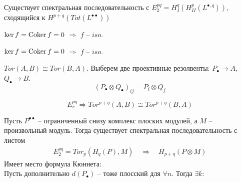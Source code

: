 \documentclass[../main.tex]{subfiles}
\begin{document}
Существует спектральная последовательность с $E_2^{pq} = H_I^{q}(H_{II}^p(L^{\bullet, q}))$, сходящийся к $H^{p+q}(Tot(L^{\bullet\bullet}))$
\begin{to_ex}
\bee
{}
\eee
$\ker f = \operatorname{Coker} f = 0 $ $\Rightarrow$ $f$ -- $iso$.
\end{to_ex}
\begin{to_ex}
\bee
{}
\eee
$\ker f = \operatorname{Coker} f = 0 $ $\Rightarrow$ $f$ -- $iso$.
\end{to_ex}
\begin{to_ex}
$Tor(A, B)\cong Tor(B, A)$. Выберем две проективные резолвенты: $P_\bullet \to A$, $Q_\bullet \to B$. \\
\[
(P_\bullet \otimes Q_\bullet)_{ij} = P_i\otimes Q_j
\]
\bee\label{tens}
\eee
\bee
{}
\eee
\[
E_r^{pq} \Rightarrow Tor^{p+q}(A, B) \cong Tor^{p+q}(B, A)
\]
\end{to_ex}
\begin{to_ex}
Пусть $P^{\bullet\bullet}$ -- ограниченный снизу комплекс плоских модулей, а $M$ -- произвольный модуль. Тогда существует спектральная последовательность с листом 
\begin{align*}
    E^{pq}_2 = Tor_p(H_q(P),M)\quad \Rightarrow \quad H_{p+q}(P \otimes M)
\end{align*}
Имеет место формула Кюннета:\\
Пусть дополнительно $d(P_\bullet)$ -- тоже плосский для $\forall n$. Тогда $\exists k$:
\bee
{}
\eee
\end{to_ex}
\end{document}
